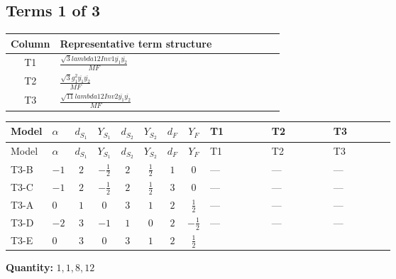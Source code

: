 \documentclass[8pt]{article}
\begin{document}
\begin{landscape}
\subsection*{Terms 1 of 3}
\begin{center}
\begin{tabular}{@{}c >{\raggedright\arraybackslash}p{0.82\linewidth}@{}}
\toprule
Column & Representative term structure \\
\midrule
T1 & \(\displaystyle \frac{\sqrt{3} lambda12Inv1 \overline{y_{1}} \overline{y_{2}}}{MF}\) \\
\midrule
T2 & \(\displaystyle \frac{\sqrt{3} g_{1}^{2} \overline{y_{1}} \overline{y_{2}}}{MF}\) \\
\midrule
T3 & \(\displaystyle \frac{\sqrt{11} lambda12Inv2 \overline{y_{1}} \overline{y_{2}}}{MF}\) \\
\midrule
\bottomrule
\end{tabular}
\end{center}
\smallskip
\tiny
\begin{longtable}{@{}llcccccc >{\raggedright\arraybackslash}p{0.21\linewidth} >{\raggedright\arraybackslash}p{0.21\linewidth} >{\raggedright\arraybackslash}p{0.21\linewidth}@{}}
\toprule
Model & $\alpha$ & $d_{S_1}$ & $Y_{S_1}$ & $d_{S_2}$ & $Y_{S_2}$ & $d_F$ & $Y_F$ & T1 & T2 & T3 \\
\midrule
\endfirsthead
\toprule
Model & $\alpha$ & $d_{S_1}$ & $Y_{S_1}$ & $d_{S_2}$ & $Y_{S_2}$ & $d_F$ & $Y_F$ & T1 & T2 & T3 \\
\midrule
\endhead
T3-B & $-1$ & $2$ & $-\frac{1}{2}$ & $2$ & $\frac{1}{2}$ & $1$ & $0$ & --- & --- & --- \\
\midrule
T3-C & $-1$ & $2$ & $-\frac{1}{2}$ & $2$ & $\frac{1}{2}$ & $3$ & $0$ & --- & --- & --- \\
\midrule
T3-A & $0$ & $1$ & $0$ & $3$ & $1$ & $2$ & $\frac{1}{2}$ & --- & --- & --- \\
\midrule
T3-D & $-2$ & $3$ & $-1$ & $1$ & $0$ & $2$ & $-\frac{1}{2}$ & --- & --- & --- \\
\midrule
T3-E & $0$ & $3$ & $0$ & $3$ & $1$ & $2$ & $\frac{1}{2}$ & \scriptsize\adjustbox{max width=\linewidth}{$\begin{gathered} - \frac{\sqrt{3} lambda12Inv1 \overline{y_{1}} \overline{y_{2}}}{6 MF}\end{gathered}$} & \scriptsize\adjustbox{max width=\linewidth}{$\begin{gathered} \frac{\sqrt{3} g_{1}^{2} \overline{y_{1}} \overline{y_{2}}}{8 MF}\end{gathered}$} & \scriptsize\adjustbox{max width=\linewidth}{$\begin{gathered} \frac{3 \sqrt{11} lambda12Inv2 \overline{y_{1}} \overline{y_{2}}}{22 MF}\end{gathered}$} \\
\midrule
\bottomrule
\end{longtable}
\clearpage
\noindent\textbf{Quantity: }$\mathrm{1,1,8,12}$\par\smallskip

\end{landscape}
\end{document}
